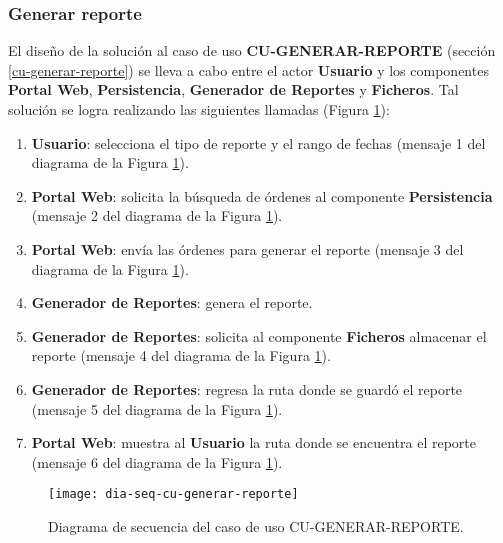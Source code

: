 \subsubsection{Generar reporte}
El diseño de la solución al caso de uso \textbf{CU-GENERAR-REPORTE} (sección \ref{cu-generar-reporte}) se lleva a cabo entre el actor \textbf{Usuario} y los componentes \textbf{Portal Web}, \textbf{Persistencia}, \textbf{Generador de Reportes} y \textbf{Ficheros}. Tal solución se logra realizando las siguientes llamadas (Figura \ref{fig:dia-seq-cu-generar-reporte}):
\begin{enumerate}
	\item \textbf{Usuario}: selecciona el tipo de reporte y el rango de fechas (mensaje 1 del diagrama de la Figura \ref{fig:dia-seq-cu-generar-reporte}).
	\item \textbf{Portal Web}: solicita la búsqueda de órdenes al componente \textbf{Persistencia} (mensaje 2 del diagrama de la Figura \ref{fig:dia-seq-cu-generar-reporte}).
	\item \textbf{Portal Web}: envía las órdenes para generar el reporte (mensaje 3 del diagrama de la Figura \ref{fig:dia-seq-cu-generar-reporte}).
	\item \textbf{Generador de Reportes}: genera el reporte.
	\item \textbf{Generador de Reportes}: solicita al componente \textbf{Ficheros} almacenar el reporte (mensaje 4 del diagrama de la Figura \ref{fig:dia-seq-cu-generar-reporte}).
	\item \textbf{Generador de Reportes}: regresa la ruta donde se guardó el reporte (mensaje 5 del diagrama de la Figura \ref{fig:dia-seq-cu-generar-reporte}).
	\item \textbf{Portal Web}: muestra al \textbf{Usuario} la ruta donde se encuentra el reporte (mensaje 6 del diagrama de la Figura \ref{fig:dia-seq-cu-generar-reporte}).
\end{enumerate}
\begin{figure}[h]
	\centering
	\texttt{[image: dia-seq-cu-generar-reporte]}
	\caption{Diagrama de secuencia del caso de uso CU-GENERAR-REPORTE.}
	\label{fig:dia-seq-cu-generar-reporte}
\end{figure}
